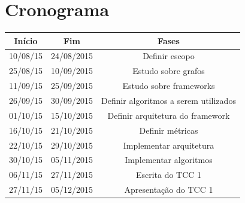 \section*{Cronograma}


\begin{tabular}{SSS} \toprule
    {Início} & {Fim} & {Fases} \\ \toprule
    {10/08/15} & {24/08/2015} & {Definir escopo} \\
    {25/08/15} & {10/09/2015} & {Estudo sobre grafos} \\
    {11/09/15} & {25/09/2015} & {Estudo sobre frameworks} \\ \midrule
    {26/09/15} & {30/09/2015} & {Definir algoritmos a serem utilizados} \\
    {01/10/15} & {15/10/2015} & {Definir arquitetura do framework} \\
    {16/10/15} & {21/10/2015} & {Definir métricas} \\ \midrule
    {22/10/15} & {29/10/2015} & {Implementar arquitetura} \\
    {30/10/15} & {05/11/2015} & {Implementar algoritmos} \\ \midrule
    {06/11/15} & {27/11/2015} & {Escrita do TCC 1} \\
    {27/11/15} & {05/12/2015} & {Apresentação do TCC 1} \\ \bottomrule
\end{tabular}

\postextual

 


